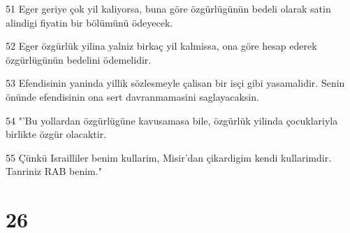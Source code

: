 \par 51 Eger geriye çok yil kaliyorsa, buna göre özgürlügünün bedeli olarak satin alindigi fiyatin bir bölümünü ödeyecek.
\par 52 Eger özgürlük yilina yalniz birkaç yil kalmissa, ona göre hesap ederek özgürlügünün bedelini ödemelidir.
\par 53 Efendisinin yaninda yillik sözlesmeyle çalisan bir isçi gibi yasamalidir. Senin önünde efendisinin ona sert davranmamasini saglayacaksin.
\par 54 "'Bu yollardan özgürlügüne kavusamasa bile, özgürlük yilinda çocuklariyla birlikte özgür olacaktir.
\par 55 Çünkü Israilliler benim kullarim, Misir'dan çikardigim kendi kullarimdir. Tanriniz RAB benim."

\chapter{26}

